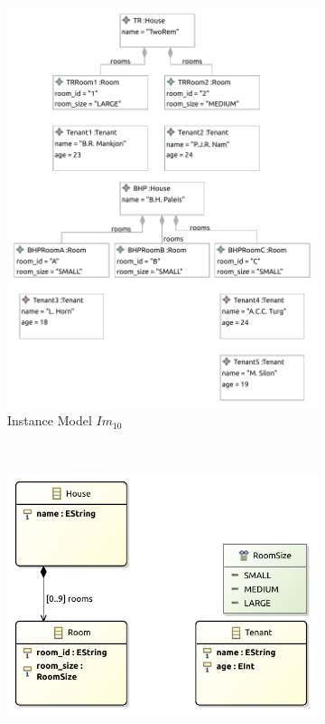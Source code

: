\begin{figure}[p]
    \centering
    \begin{subfigure}{0.98\textwidth}
        \centering
        \includegraphics{images/06_application/instance_model/step10.pdf}
        \caption{Instance Model $Im_{10}$}
        \label{fig:application:building_the_model:tenant_ages:ecore:instance_model}
    \end{subfigure}
    \\
    \begin{subfigure}{0.98\textwidth}
        \centering
        \includegraphics{images/06_application/type_model/step10.pdf}

\end{subfigure}
\end{figure}
